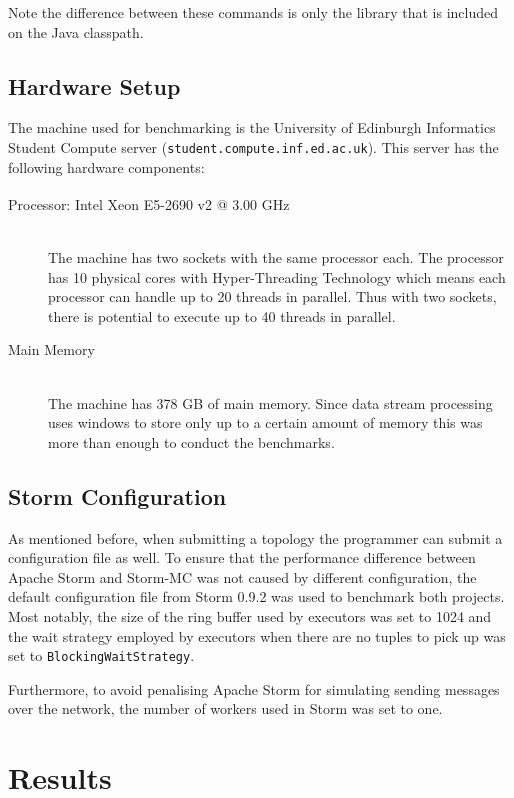 \documentclass[bsc,deptreport,twoside,singlespacing,normalheadings,parskip]{infthesis}\usepackage[]{graphicx}\usepackage[]{color}
\begin{document}
Note the difference between these commands is only the library that is included on the Java classpath.

\subsection{Hardware Setup}

The machine used for benchmarking is the University of Edinburgh Informatics Student Compute server (\texttt{student.compute.inf.ed.ac.uk}). This server has the following hardware components:

\begin{description}
	\item[Processor: Intel\textsuperscript{\textregistered} Xeon\textsuperscript{\textregistered} E5-2690 v2 @ 3.00 GHz] \hfill \\
	The machine has two sockets with the same processor each. The processor has 10 physical cores with Hyper-Threading Technology which means each processor can handle up to 20 threads in parallel. Thus with two sockets, there is potential to execute up to 40 threads in parallel.
	\item[Main Memory] \hfill \\
	The machine has 378 GB of main memory. Since data stream processing uses windows to store only up to a certain amount of memory this was more than enough to conduct the benchmarks.
\end{description}

\subsection{Storm Configuration}

As mentioned before, when submitting a topology the programmer can submit a configuration file as well. To ensure that the performance difference between Apache Storm and Storm-MC was not caused by different configuration, the default configuration file from Storm 0.9.2 was used to benchmark both projects. Most notably, the size of the ring buffer used by executors was set to 1024 and the wait strategy employed by executors when there are no tuples to pick up was set to \texttt{BlockingWaitStrategy}.

Furthermore, to avoid penalising Apache Storm for simulating sending messages over the network, the number of workers used in Storm was set to one.

\section{Results}
\label{sec:performance}
\end{document}
